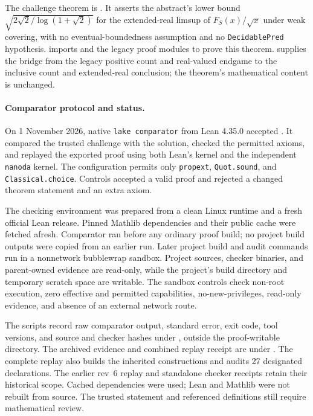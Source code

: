 \documentclass[11pt]{article}
\begin{document}
The challenge theorem is . It asserts the abstract's lower bound $\sqrt{2\sqrt2/\log(1+\sqrt2)}$ for the extended-real limsup of $F_S(x)/\sqrt{x}$ under weak covering, with no eventual-boundedness assumption and no \texttt{DecidablePred} hypothesis.  imports  and the legacy proof modules to prove this theorem.  supplies the bridge from the legacy positive count and real-valued endgame to the inclusive count and extended-real conclusion; the theorem's mathematical content is unchanged.

\paragraph{Comparator protocol and status.}
On 1 November 2026, native \texttt{lake comparator} from Lean 4.35.0 accepted . It compared the trusted challenge with the solution, checked the permitted axioms, and replayed the exported proof using both Lean's kernel and the independent \texttt{nanoda} kernel. The configuration permits only \texttt{propext}, \texttt{Quot.sound}, and \texttt{Classical.choice}. Controls accepted a valid proof and rejected a changed theorem statement and an extra axiom.

The checking environment was prepared from a clean Linux runtime and a fresh official Lean release. Pinned Mathlib dependencies and their public cache were fetched afresh. Comparator ran before any ordinary proof build; no project build outputs were copied from an earlier run. Later project build and audit commands run in a nonnetwork bubblewrap sandbox. Project sources, checker binaries, and parent-owned evidence are read-only, while the project's  build directory and temporary scratch space are writable. The sandbox controls check non-root execution, zero effective and permitted capabilities, no-new-privileges, read-only evidence, and absence of an external network route.

The scripts record raw comparator output, standard error, exit code, tool versions, and source and checker hashes under , outside the proof-writable  directory. The archived evidence and combined replay receipt are under . The complete replay also builds the inherited constructions and audits 27 designated declarations. The earlier rev~6 replay and standalone checker receipts retain their historical scope. Cached dependencies were used; Lean and Mathlib were not rebuilt from source. The trusted statement and referenced definitions still require mathematical review.
\end{document}
